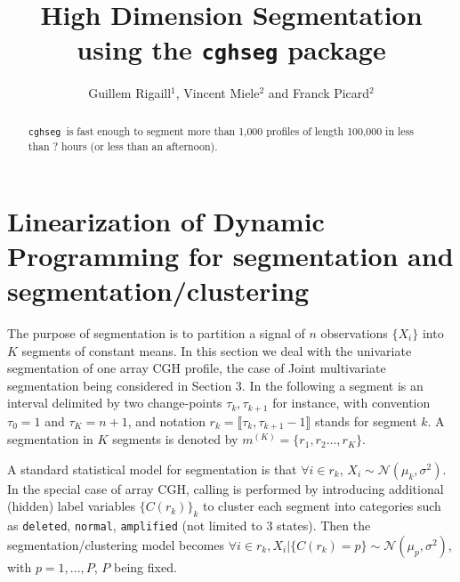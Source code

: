 \documentclass[article,10pt]{llncs}
\newcommand{\esoft}{\texttt{cghseg }}
\begin{document}
\title{High Dimension Segmentation using the \texttt{cghseg} package}
%
%
\author{Guillem Rigaill$^1$, Vincent Miele$^2$ and Franck Picard$^2$}
%
%
%

\maketitle   

\begin{abstract}
\esoft is fast enough to segment more than 1,000 profiles of length 100,000 in less than ? hours (or less than an afternoon).

\keywords{}
\end{abstract}
\section{Linearization of Dynamic Programming for segmentation and segmentation/clustering} 

The purpose of segmentation is to partition a signal of $n$ observations $\{X_i\}$ into $K$ segments of constant means. In this section we deal with the univariate segmentation of one array CGH profile, the case of Joint multivariate segmentation being considered in Section 3. In the following a segment is an interval delimited by two change-points $\tau_k, \tau_{k+1}$ for instance,  with convention $\tau_0 = 1$ and $\tau_K = n+1$, and notation $r_k=\llbracket \tau_k, \tau_{k+1} -1\rrbracket$ stands for segment $k$. A segmentation in $K$ segments is denoted by $m^{(K)} = \{r_1, r_2 \ldots, r_K\}$.

A standard statistical model for segmentation is that $\forall i \in r_k$, $X_i\sim \mathcal{N}(\mu_k,\sigma^2)$. In the special case of array CGH, calling is performed by introducing additional (hidden) label variables $\{C(r_k)\}_k$ to cluster each segment into categories such as \texttt{deleted}, \texttt{normal}, \texttt{amplified} (not limited to 3 states). Then the segmentation/clustering model becomes  $\forall i \in r_k, X_i|\{C(r_k)=p\} \sim \mathcal{N}(\mu_p,\sigma^2)$, with $p=1,...,P$, $P$ being fixed.
\end{document}
